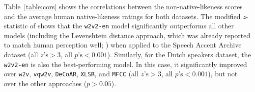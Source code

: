 \documentclass[11pt,a4paper]{article}
\begin{document}
Table~\ref{table:cors} shows the correlations between the non-native-likeness scores and the average human native-likeness ratings for both datasets. The modified \textit{z}-statistic of \citet{steiger1980tests} shows that the \texttt{w2v2-en} model significantly outperforms all other models (including the Levenshtein distance approach, which was already reported to match human perception well; \citealp{wieling2014a}) when applied to the Speech Accent Archive dataset (all $z\textrm{'s} > 3$, all $p\textrm{'s} < 0.001$). Similarly, for the Dutch speakers dataset, the \texttt{w2v2-en} is also the best-performing model. In this case, it significantly improved over \texttt{w2v}, \texttt{vqw2v}, \texttt{DeCoAR}, \texttt{XLSR}, and \texttt{MFCC} (all $z\textrm{'s} > 3$, all $p\textrm{'s} < 0.001$), but not over the other approaches ($p > 0.05$). 
\end{document}
